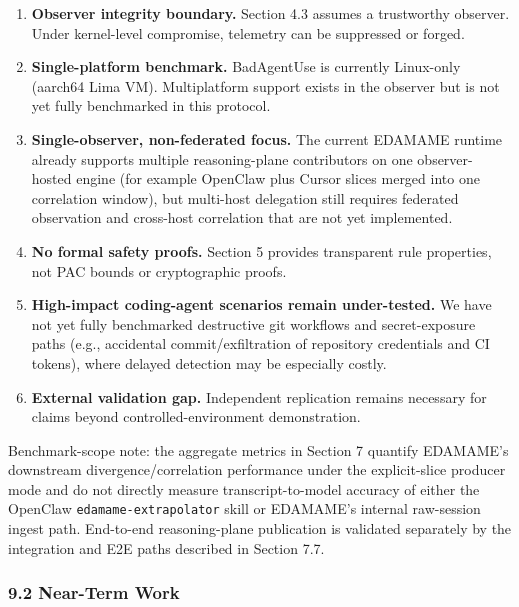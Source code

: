 \documentclass[
]{article}
\begin{document}
\begin{enumerate}
  the transcript while achieving malicious outcomes through side effects
  invisible to the session record.
\item
  \textbf{Observer integrity boundary.} Section 4.3 assumes a
  trustworthy observer. Under kernel-level compromise, telemetry can be
  suppressed or forged.
\item
  \textbf{Single-platform benchmark.} BadAgentUse is currently
  Linux-only (aarch64 Lima VM). Multiplatform support exists in the
  observer but is not yet fully benchmarked in this protocol.
\item
  \textbf{Single-observer, non-federated focus.} The current EDAMAME
  runtime already supports multiple reasoning-plane contributors on one
  observer-hosted engine (for example OpenClaw plus Cursor slices merged
  into one correlation window), but multi-host delegation still requires
  federated observation and cross-host correlation that are not yet
  implemented.
\item
  \textbf{No formal safety proofs.} Section 5 provides transparent rule
  properties, not PAC bounds or cryptographic proofs.
\item
  \textbf{High-impact coding-agent scenarios remain under-tested.} We
  have not yet fully benchmarked destructive git workflows and
  secret-exposure paths (e.g., accidental commit/exfiltration of
  repository credentials and CI tokens), where delayed detection may be
  especially costly.
\item
  \textbf{External validation gap.} Independent replication remains
  necessary for claims beyond controlled-environment demonstration.
\end{enumerate}

Benchmark-scope note: the aggregate metrics in Section 7 quantify
EDAMAME's downstream divergence/correlation performance under the
explicit-slice producer mode and do not directly measure
transcript-to-model accuracy of either the OpenClaw
\texttt{edamame-extrapolator} skill or EDAMAME's internal raw-session
ingest path. End-to-end reasoning-plane publication is validated
separately by the integration and E2E paths described in Section 7.7.

\subsubsection{9.2 Near-Term Work}\label{near-term-work}
\end{document}
